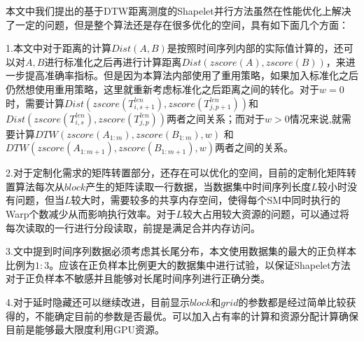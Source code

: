 本文中我们提出的基于DTW距离测度的Shapelet并行方法虽然在性能优化上解决了一定的问题，但是整个算法还是存在很多优化的空间，具有如下面几个方面：

1.本文中对于距离的计算$Dist(A,B)$是按照时间序列内部的实际值计算的，还可以对$A,B$进行标准化之后再进行计算距离$Dist(zscore(A),zscore(B))$，来进一步提高准确率指标。但是因为本算法内部使用了重用策略，如果加入标准化之后仍然想使用重用策略，这里就重新考虑标准化之后距离之间的转化。对于$w=0$时，需要计算$Dist(zscore(T_{i,s+1}^{len}),zscore(T_{j,p+1}^{len}))$和$Dist(zscore(T_{i,s}^{len}),zscore(T_{j,p}^{len}))$两者之间关系；而对于$w>0$情况来说,就需要计算$DTW(zscore(A_{1:m}),zscore(B_{1:m}),w)$ 和 $DTW(zscore(A_{1:m+1}),zscore(B_{1:m+1}),w)$两者之间的关系。

2.对于定制化需求的矩阵转置部分，还存在可以优化的空间，目前的定制化矩阵转置算法每次从$block$产生的矩阵读取一行数据，当数据集中时间序列长度$L$较小时没有问题，但当$L$较大时，需要较多的共享内存空间，使得每个SM中同时执行的Warp个数减少从而影响执行效率。对于$L$较大占用较大资源的问题，可以通过将每次读取的一行进行分段读取，前提是满足合并内存访问。

3.文中提到时间序列数据必须考虑其长尾分布，本文使用数据集的最大的正负样本比例为$1:3$。应该在正负样本比例更大的数据集中进行试验，以保证Shapelet方法对于正负样本不敏感并且能够对长尾时间序列进行正确分类。

4.对于延时隐藏还可以继续改进，目前显示$block$和$grid$的参数都是经过简单比较获得的，不能确定目前的参数是否最优。可以加入占有率的计算和资源分配计算确保目前是能够最大限度利用GPU资源。


